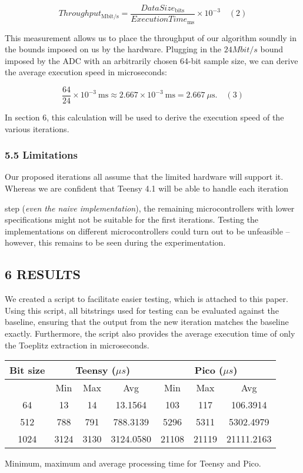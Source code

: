 \documentclass{sigchi}
\begin{document}
\[
Throughput_\mathrm{Mbit/s}
= \frac{DataSize_\mathrm{bits}}{ExecutionTime_\mathrm{ms}}
\times 10^{-3}
\phantom{12}(2)
\]

This measurement allows us to place the throughput of our algorithm soundly in the bounds imposed on us by the hardware. Plugging in the \(24 Mbit/s\) bound imposed by the ADC with an arbitrarily chosen 64-bit sample size, we can derive the average execution speed in microseconds:

\[
\frac{64}{24}\times10^{-3}\ \mathrm{ms}
\approx 2.667\times10^{-3}\ \mathrm{ms}
=2.667\ \mu\mathrm{s}.
\phantom{12}(3)
\]

In section 6, this calculation will be used to derive the execution speed of the various iterations.

\subsubsection{5.5 Limitations}\label{limitations}

Our proposed iterations all assume that the limited hardware will support it. Whereas we are confident that Teensy 4.1 will be able to handle each iteration

step (\emph{even the naive implementation}), the remaining microcontrollers with lower specifications might not be suitable for the first iterations. Testing the implementations on different microcontrollers could turn out to be unfeasible -- however, this remains to be seen during the experimentation.

\subsection{6 RESULTS}\label{results}

We created a script to facilitate easier testing, which is attached to this paper. Using this script, all bitstrings used for testing can be evaluated against the baseline, ensuring that the output from the new iteration matches the baseline exactly. Furthermore, the script also provides the average execution time of only the Toeplitz extraction in microseconds.

\begin{tabular}{|c|c|c|c|c|c|c|} \hline \textbf{Bit size} &
\multicolumn{3}{c|}{\textbf{Teensy ($\mu s$)}} &
\multicolumn{3}{c|}{\textbf{Pico ($\mu s$)}} \\ \hline & Min & Max & Avg & Min &
Max & Avg \\ \hline 64 & 13 & 14 & 13.1564 & 103 & 117 & 106.3914 \\ 512 & 788 &
791 & 788.3139 & 5296 & 5311 & 5302.4979 \\ 1024 & 3124 & 3130 & 3124.0580 &
21108 & 21119 & 21111.2163 \\ \hline \end{tabular} \caption{Minimum, maximum and
average processing time for Teensy and Pico.}
\label{tab:teensy_pico_min_max_avg}
\end{document}
